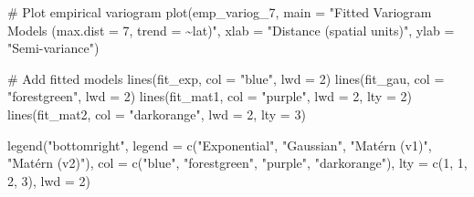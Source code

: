 \documentclass[
  11pt,
]{article}
\newenvironment{Shaded}{\begin{snugshade}}{\end{snugshade}}
\newcommand{\AttributeTok}[1]{\textcolor[rgb]{0.40,0.45,0.13}{#1}}
\newcommand{\CommentTok}[1]{\textcolor[rgb]{0.37,0.37,0.37}{#1}}
\newcommand{\DecValTok}[1]{\textcolor[rgb]{0.68,0.00,0.00}{#1}}
\newcommand{\FunctionTok}[1]{\textcolor[rgb]{0.28,0.35,0.67}{#1}}
\newcommand{\NormalTok}[1]{\textcolor[rgb]{0.00,0.23,0.31}{#1}}
\newcommand{\StringTok}[1]{\textcolor[rgb]{0.13,0.47,0.30}{#1}}
\begin{document}
\begin{Shaded}
\begin{Highlighting}[]
\CommentTok{\# Plot empirical variogram}
\FunctionTok{plot}\NormalTok{(emp\_variog\_7,}
     \AttributeTok{main =} \StringTok{"Fitted Variogram Models (max.dist = 7, trend = \textasciitilde{}lat)"}\NormalTok{,}
     \AttributeTok{xlab =} \StringTok{"Distance (spatial units)"}\NormalTok{, }\AttributeTok{ylab =} \StringTok{"Semi{-}variance"}\NormalTok{)}

\CommentTok{\# Add fitted models}
\FunctionTok{lines}\NormalTok{(fit\_exp, }\AttributeTok{col =} \StringTok{"blue"}\NormalTok{, }\AttributeTok{lwd =} \DecValTok{2}\NormalTok{)}
\FunctionTok{lines}\NormalTok{(fit\_gau, }\AttributeTok{col =} \StringTok{"forestgreen"}\NormalTok{, }\AttributeTok{lwd =} \DecValTok{2}\NormalTok{)}
\FunctionTok{lines}\NormalTok{(fit\_mat1, }\AttributeTok{col =} \StringTok{"purple"}\NormalTok{, }\AttributeTok{lwd =} \DecValTok{2}\NormalTok{, }\AttributeTok{lty =} \DecValTok{2}\NormalTok{)}
\FunctionTok{lines}\NormalTok{(fit\_mat2, }\AttributeTok{col =} \StringTok{"darkorange"}\NormalTok{, }\AttributeTok{lwd =} \DecValTok{2}\NormalTok{, }\AttributeTok{lty =} \DecValTok{3}\NormalTok{)}

\FunctionTok{legend}\NormalTok{(}\StringTok{"bottomright"}\NormalTok{,}
       \AttributeTok{legend =} \FunctionTok{c}\NormalTok{(}\StringTok{"Exponential"}\NormalTok{, }\StringTok{"Gaussian"}\NormalTok{, }\StringTok{"Matérn (v1)"}\NormalTok{, }\StringTok{"Matérn (v2)"}\NormalTok{),}
       \AttributeTok{col =} \FunctionTok{c}\NormalTok{(}\StringTok{"blue"}\NormalTok{, }\StringTok{"forestgreen"}\NormalTok{, }\StringTok{"purple"}\NormalTok{, }\StringTok{"darkorange"}\NormalTok{),}
       \AttributeTok{lty =} \FunctionTok{c}\NormalTok{(}\DecValTok{1}\NormalTok{, }\DecValTok{1}\NormalTok{, }\DecValTok{2}\NormalTok{, }\DecValTok{3}\NormalTok{),}
       \AttributeTok{lwd =} \DecValTok{2}\NormalTok{)}
\end{Highlighting}
\end{Shaded}
\end{document}
